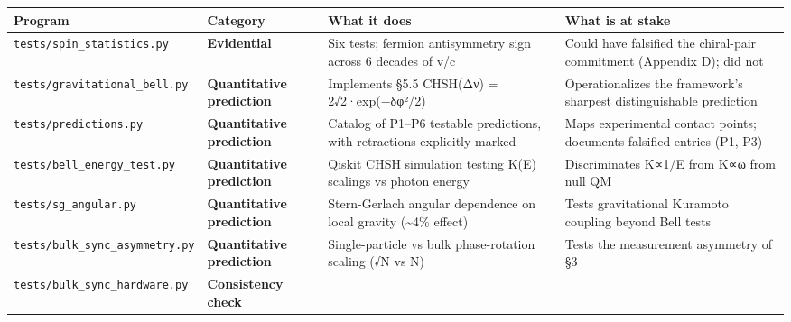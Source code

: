 \documentclass[
]{article}
\newcounter{none} %
\begin{document}
{\def\LTcaptype{none} %
\begin{longtable}[]{@{}
  >{\raggedright\arraybackslash}p{}
  >{\raggedright\arraybackslash}p{}
  >{\raggedright\arraybackslash}p{}
  >{\raggedright\arraybackslash}p{}@{}}
\toprule\noalign{}
\begin{minipage}[b]{\linewidth}\raggedright
Program
\end{minipage} & \begin{minipage}[b]{\linewidth}\raggedright
Category
\end{minipage} & \begin{minipage}[b]{\linewidth}\raggedright
What it does
\end{minipage} & \begin{minipage}[b]{\linewidth}\raggedright
What is at stake
\end{minipage} \\
\midrule\noalign{}
\endhead
\bottomrule\noalign{}
\endlastfoot
\texttt{tests/spin\_statistics.py} & \textbf{Evidential} & Six tests;
fermion antisymmetry sign across 6 decades of v/c & Could have falsified
the chiral-pair commitment (Appendix D); did not \\
\texttt{tests/gravitational\_bell.py} & \textbf{Quantitative prediction}
& Implements §5.5 CHSH(Δν) = 2√2·exp(−δφ²/2) & Operationalizes the
framework's sharpest distinguishable prediction \\
\texttt{tests/predictions.py} & \textbf{Quantitative prediction} &
Catalog of P1--P6 testable predictions, with retractions explicitly
marked & Maps experimental contact points; documents falsified entries
(P1, P3) \\
\texttt{tests/bell\_energy\_test.py} & \textbf{Quantitative prediction}
& Qiskit CHSH simulation testing K(E) scalings vs photon energy &
Discriminates K∝1/E from K∝ω from null QM \\
\texttt{tests/sg\_angular.py} & \textbf{Quantitative prediction} &
Stern-Gerlach angular dependence on local gravity (\textasciitilde4\%
effect) & Tests gravitational Kuramoto coupling beyond Bell tests \\
\texttt{tests/bulk\_sync\_asymmetry.py} & \textbf{Quantitative
prediction} & Single-particle vs bulk phase-rotation scaling (√N vs N) &
Tests the measurement asymmetry of §3 \\
\texttt{tests/bulk\_sync\_hardware.py} & \textbf{Consistency check
}
\end{longtable}}
\end{document}

